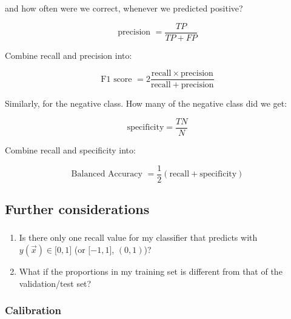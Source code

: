 \begin{frame}
{and how often were we correct, whenever we predicted positive?

\begin{equation}
\text{precision }
 = \frac{TP}{TP+FP}
\end{equation}

Combine recall and precision into:

\begin{equation}
\text{F1 score }
 = 2 \frac{\mathrm{recall} \times \mathrm{precision}}{\mathrm{recall} + \mathrm{precision}}
\end{equation}

Similarly, for the negative class. How many of the negative class did we get:

\begin{equation}
\text{specificity}
 = \frac{TN}{N}
\end{equation}


Combine recall and specificity into:


\begin{equation}
\text{Balanced Accuracy }
 = \frac{1}{2} (\mathrm{recall} + \mathrm{specificity})
\end{equation}

}

\end{frame}

\subsection{Further considerations}

\begin{frame}\frametitle{\subsecname}

\begin{enumerate}
\item
Is there only one recall value for my classifier that predicts with\\
 $y(\vec x) \in \lbrack0,1\rbrack$ (or $\lbrack-1,1\rbrack$, $(0,1)$)?
\item
What if the proportions in my training set is different from that of the validation/test set?
\end{enumerate}


\end{frame}

\subsubsection{Calibration}

